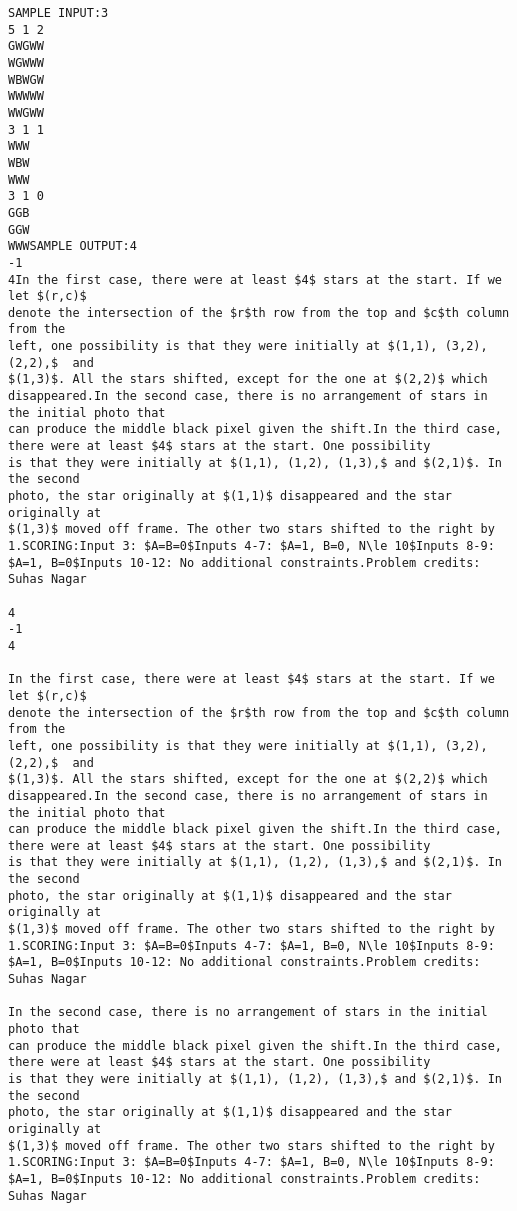 \documentclass[12pt]{article}
\begin{document}
\begin{verbatim}
SAMPLE INPUT:3
5 1 2
GWGWW
WGWWW
WBWGW
WWWWW
WWGWW
3 1 1
WWW
WBW
WWW
3 1 0
GGB
GGW
WWWSAMPLE OUTPUT:4
-1
4In the first case, there were at least $4$ stars at the start. If we let $(r,c)$
denote the intersection of the $r$th row from the top and $c$th column from the
left, one possibility is that they were initially at $(1,1), (3,2), (2,2),$  and
$(1,3)$. All the stars shifted, except for the one at $(2,2)$ which disappeared.In the second case, there is no arrangement of stars in the initial photo that
can produce the middle black pixel given the shift.In the third case, there were at least $4$ stars at the start. One possibility
is that they were initially at $(1,1), (1,2), (1,3),$ and $(2,1)$. In the second
photo, the star originally at $(1,1)$ disappeared and the star originally at
$(1,3)$ moved off frame. The other two stars shifted to the right by 1.SCORING:Input 3: $A=B=0$Inputs 4-7: $A=1, B=0, N\le 10$Inputs 8-9: $A=1, B=0$Inputs 10-12: No additional constraints.Problem credits: Suhas Nagar

4
-1
4

In the first case, there were at least $4$ stars at the start. If we let $(r,c)$
denote the intersection of the $r$th row from the top and $c$th column from the
left, one possibility is that they were initially at $(1,1), (3,2), (2,2),$  and
$(1,3)$. All the stars shifted, except for the one at $(2,2)$ which disappeared.In the second case, there is no arrangement of stars in the initial photo that
can produce the middle black pixel given the shift.In the third case, there were at least $4$ stars at the start. One possibility
is that they were initially at $(1,1), (1,2), (1,3),$ and $(2,1)$. In the second
photo, the star originally at $(1,1)$ disappeared and the star originally at
$(1,3)$ moved off frame. The other two stars shifted to the right by 1.SCORING:Input 3: $A=B=0$Inputs 4-7: $A=1, B=0, N\le 10$Inputs 8-9: $A=1, B=0$Inputs 10-12: No additional constraints.Problem credits: Suhas Nagar

In the second case, there is no arrangement of stars in the initial photo that
can produce the middle black pixel given the shift.In the third case, there were at least $4$ stars at the start. One possibility
is that they were initially at $(1,1), (1,2), (1,3),$ and $(2,1)$. In the second
photo, the star originally at $(1,1)$ disappeared and the star originally at
$(1,3)$ moved off frame. The other two stars shifted to the right by 1.SCORING:Input 3: $A=B=0$Inputs 4-7: $A=1, B=0, N\le 10$Inputs 8-9: $A=1, B=0$Inputs 10-12: No additional constraints.Problem credits: Suhas Nagar


\end{verbatim}
\end{document}
